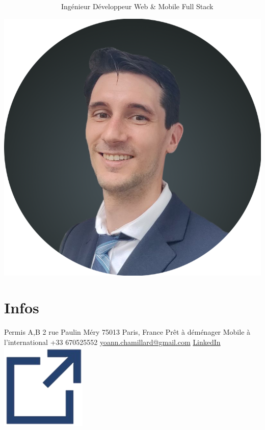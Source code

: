 \documentclass[]{friggeri-cv}
\begin{document}
      {~~~~~~~~~~~~~~~~Ingénieur Développeur Web \& Mobile Full Stack}
      {}

\begin{aside}
\hspace{10mm}\includegraphics[scale=0.148]{res/img/Photo_CV.png}\section{Infos}
Permis A,B\vspace{2.5mm}
2 rue Paulin Méry
75013 Paris,
France\vspace{1.5mm}
Prêt à déménager
Mobile à l'international\vspace{2.5mm}
+33 670525552
\href{mailto:yoann.chamillard@gmail.com}{\small yoann.chamillard@gmail.com}\vspace{2.5mm}
\href{http://fr.linkedin.com/in/yoannchamillard}{LinkedIn\hspace{1.5mm}\includegraphics[scale=0.075]{res/img/hlink.png}}

\end{aside}
\end{document}
